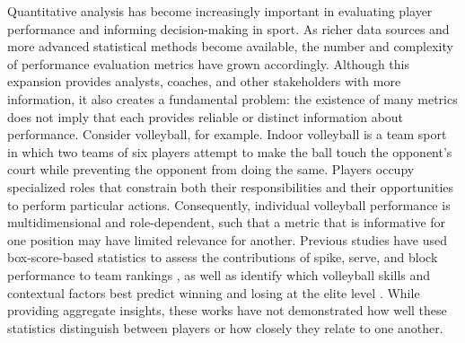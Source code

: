 \documentclass[10pt]{article}
\begin{document}
Quantitative analysis has become increasingly important in evaluating player performance and informing decision-making in sport.
As richer data sources and more advanced statistical methods become available, the number and complexity of performance evaluation metrics have grown accordingly.
Although this expansion provides analysts, coaches, and other stakeholders with more information, it also creates a fundamental problem: the existence of many metrics does not imply that each provides reliable or distinct information about performance.
Consider volleyball, for example.
Indoor volleyball is a team sport in which two teams of six players attempt to make the ball touch the opponent's court while preventing the opponent from doing the same.
Players occupy specialized roles that constrain both their responsibilities and their opportunities to perform particular actions.
Consequently, individual volleyball performance is multidimensional and role-dependent, such that a metric that is informative for one position may have limited relevance for another.
Previous studies have used box-score-based statistics to assess the contributions of spike, serve, and block performance to team rankings \citep{marcelino_weight_2008}, as well as identify which volleyball skills and contextual factors best predict winning and losing at the elite level \citep{pena_which_2013}.
While providing aggregate insights, these works have not demonstrated how well these statistics distinguish between players or how closely they relate to one another.
\end{document}
